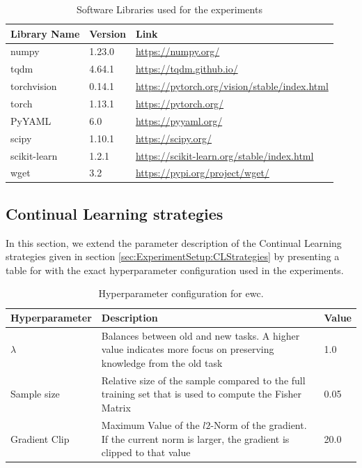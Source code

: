 \begin{table}[!htb]
    \centering
    \begin{tabular}{|l | l l |} 
        \hline
        Library Name & Version & Link \\ 
        \hline 
        numpy & 1.23.0 & \url{https://numpy.org/} \\
        tqdm & 4.64.1 & \url{https://tqdm.github.io/}  \\
        torchvision & 0.14.1 & \url{https://pytorch.org/vision/stable/index.html} \\ 
        torch & 1.13.1 & \url{https://pytorch.org/} \\
        PyYAML & 6.0 & \url{https://pyyaml.org/} \\
        scipy & 1.10.1 & \url{https://scipy.org/} \\
        scikit-learn & 1.2.1 & \url{https://scikit-learn.org/stable/index.html} \\
        wget & 3.2 & \url{https://pypi.org/project/wget/} \\
        \hline
    \end{tabular}
    \caption{Software Libraries used for the experiments}
    \label{fig:Libraries}
\end{table}

\subsection{Continual Learning strategies}
\label{sec:Appendix:CLStrategies}
In this section, we extend the parameter description of the Continual Learning strategies given in section 
\ref{sec:ExperimentSetup:CLStrategies} by presenting a table for with the exact hyperparameter configuration
used in the experiments.

\begin{table}[!htb]
    \begin{tabularx}{\textwidth}{|l | X | l |} 
        \hline
        Hyperparameter & Description & Value \\ 
        \hline 
        $\lambda$ & Balances between old and new tasks. A higher value indicates more focus 
        on preserving knowledge from the old task & 1.0  \\ 
        \hline
        Sample size & Relative size of the sample compared to the full training set that is used to 
        compute the Fisher Matrix & 0.05  \\ 
        \hline
        Gradient Clip & Maximum Value of the $l2$-Norm of the gradient. If the current norm is larger,
        the gradient is clipped to that value & 20.0 \\ 
        \hline
    \end{tabularx}
    \caption{Hyperparameter configuration for \gls{ewc}.}
    \label{fig:EWCparams}
\end{table}


